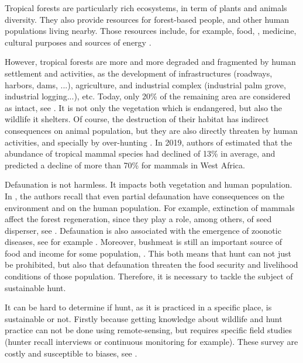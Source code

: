 \documentclass{article}
\begin{document}
Tropical forests are particularly rich ecosystems, in term of plants and animals diversity. They also provide resources for forest-based people, and other human populations living nearby. Those resources include, for example, food, \cite{avila_martin_food_2024}, medicine, cultural purposes \cite{kumar_marginal_2014} and sources of energy \cite{mangula_energy_2019}.

However, tropical forests are more and more degraded and fragmented by human settlement and activities, as the development of infrastructures (roadways, harbors, dams, ...), agriculture, and industrial complex (industrial palm grove, industrial logging...), etc. 
Today, only 20\% of the remaining area are considered as intact, see \cite{benitez-lopez_intact_2019}. It is not only the vegetation which is endangered, but also the wildlife it shelters. Of course, the destruction of their habitat has indirect consequences on animal population, but they are also directly threaten by human activities, and specially by over-hunting \cite{benitez-lopez_intact_2019, wilkie_empty_2011}. In 2019, authors of \cite{benitez-lopez_intact_2019} estimated that the abundance of tropical mammal species had declined of 13\% in average, and predicted a decline of more than 70\% for mammals in West Africa. 

Defaunation is not harmless. It impacts both vegetation and human population. In \cite{ripple_bushmeat_2016}, the authors recall that even partial defaunation have consequences on the environment and on the human population. For example, extinction of mammals affect the forest regeneration, since they play a role, among others, of seed disperser, see \cite{peres_dispersal_2016, wright_bushmeat_2007}. Defaunation is also associated with the emergence of zoonotic diseases, see for example \cite{dobigny_zoonotic_2022, white_emerging_2020}. Moreover, bushmeat is still an important source of food and income for some population, \cite{jones_incentives_2019}. This both means that hunt can not just be prohibited, but also that defaunation threaten the food security and livelihood conditions of those population. Therefore, it is necessary to tackle the subject of sustainable hunt.

It can be hard to determine if hunt, as it is practiced in a specific place, is sustainable or not. Firstly because getting knowledge about wildlife and hunt practice can not be done using remote-sensing, but requires specific field studies \cite{peres_detecting_2006} (hunter recall interviews or continuous monitoring for example). These survey are costly and susceptible to biases, see \cite{jones_consequences_2020}.
\end{document}
